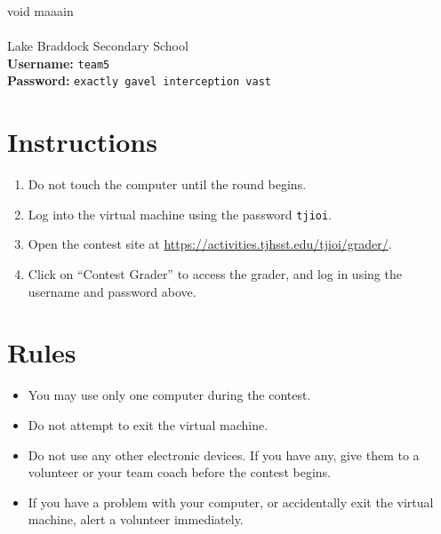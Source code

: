 \documentclass[12pt]{article}
\begin{document}
{\Huge void maaain}\\\\
{\Large Lake Braddock Secondary School}\\

\textbf{Username:} \verb|team5|\\
\textbf{Password:} \verb|exactly gavel interception vast|

\section*{Instructions}

\begin{enumerate}
    \item Do not touch the computer until the round begins.
    \item Log into the virtual machine using the password \verb|tjioi|.
    \item Open the contest site at \url{https://activities.tjhsst.edu/tjioi/grader/}.
    \item Click on ``Contest Grader'' to access the grader, and log in using the username and password above.
\end{enumerate}

\section*{Rules}

\begin{itemize}
    \item You may use only one computer during the contest.
    \item Do not attempt to exit the virtual machine.
    \item Do not use any other electronic devices. If you have any, give them to a volunteer or your team coach before the contest begins.
    \item If you have a problem with your computer, or accidentally exit the virtual machine, alert a volunteer immediately.
\end{itemize}
\end{document}
